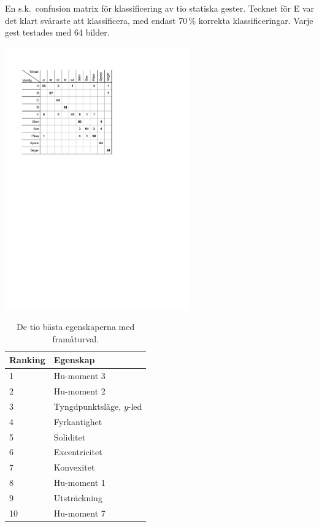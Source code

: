 \documentclass[../rapport_MVEX01-11-05]{subfiles}
\begin{document}
\begin{table}[tbp]
	  \centering
		\caption{En s.k.~confusion matrix för klassificering
                  av tio statiska gester. Tecknet för E var det klart
                  svåraste att klassificera, med endast 70\,\%
                  korrekta klassificeringar. Varje gest testades med
                  64 bilder.}
		\label{tab:tolkningsmatris}
    \includegraphics[trim=2cm 16cm 8cm 2.5cm,clip=true,width=8cm]{bilder/tolkningsmatris.pdf}
\end{table}

\begin{table}[tb]
	\centering
	\caption{De tio bästa egenskaperna med framåturval.}
	
	\label{tab:bestfeatsfwd}
	\begin{tabular}{ll}
		\toprule
		Ranking & Egenskap \\
		\midrule
		1 & Hu-moment 3 \\
		2 & Hu-moment 2 \\
		3 & Tyngdpunktsläge, $y$-led \\
		4 & Fyrkantighet \\
		5 & Soliditet \\
		6 & Excentricitet \\
		7 & Konvexitet \\
		8 & Hu-moment 1 \\
		9 & Utsträckning \\
		10 & Hu-moment 7 \\
		\bottomrule
	\end{tabular}
\end{table}
\end{document}
